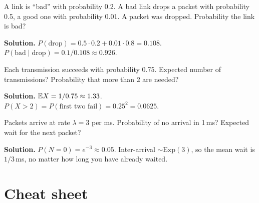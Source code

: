 \begin{example}
A link is ``bad'' with probability 0.2. A bad link drops a packet with probability 0.5, a good one with probability 0.01. A packet was dropped. Probability the link is bad?

\textbf{Solution.} $P(\text{drop})=0.5\cdot0.2+0.01\cdot0.8=0.108$. $P(\text{bad}\mid\text{drop})=0.1/0.108\approx0.926$.
\end{example}

\begin{example}[P5: Geometric]
Each transmission succeeds with probability 0.75. Expected number of transmissions? Probability that more than 2 are needed?

\textbf{Solution.} $\mathbb{E} X=1/0.75\approx1.33$. $P(X>2)=P(\text{first two fail})=0.25^2=0.0625$.
\end{example}

\begin{example}[P6: Poisson]
Packets arrive at rate $\lambda=3$ per ms. Probability of no arrival in 1\,ms? Expected wait for the next packet?

\textbf{Solution.} $P(N=0)=e^{-3}\approx0.05$. Inter-arrival $\sim\text{Exp}(3)$, so the mean wait is $1/3$\,ms, no matter how long you have already waited.
\end{example}

\section{Cheat sheet}

